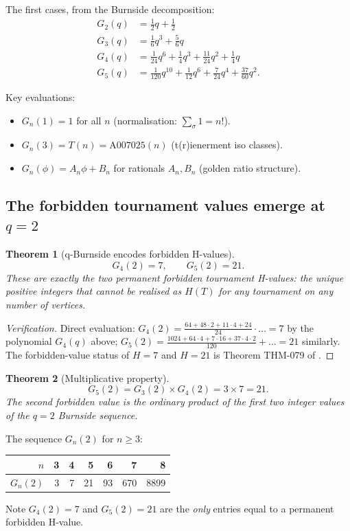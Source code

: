 \documentclass[12pt,reqno]{amsart}
\newtheorem{theorem}{Theorem}[section]
\theoremstyle{definition}
\theoremstyle{plain}
\begin{document}
The first cases, from the Burnside decomposition:
\begin{align*}
G_2(q)&=\tfrac{1}{2}q+\tfrac{1}{2}\\
G_3(q)&=\tfrac{1}{6}q^3+\tfrac{5}{6}q\\
G_4(q)&=\tfrac{1}{24}q^6+\tfrac{1}{4}q^3+\tfrac{11}{24}q^2+\tfrac{1}{4}q\\
G_5(q)&=\tfrac{1}{120}q^{10}+\tfrac{1}{12}q^6+\tfrac{7}{24}q^4+\tfrac{37}{60}q^2.
\end{align*}

Key evaluations:
\begin{itemize}
\item $G_n(1)=1$ for all $n$ (normalisation: $\sum_\sigma 1=n!$).
\item $G_n(3)=T(n)=\mathrm{A007025}(n)$ (t(r)ienerment iso classes).
\item $G_n(\phi)=A_n\phi+B_n$ for rationals $A_n,B_n$ (golden ratio structure).
\end{itemize}

\subsection{The forbidden tournament values emerge at \texorpdfstring{$q=2$}{q=2}}
\label{ssec:forbidden-q2}

\begin{theorem}[q-Burnside encodes forbidden H-values]\label{thm:q2-forbidden}
\[
  G_4(2)=7,\qquad G_5(2)=21.
\]
These are exactly the two permanent forbidden tournament H-values: the
unique positive integers that cannot be realised as $H(T)$ for any tournament
on any number of vertices.
\end{theorem}

\begin{proof}[Verification]
Direct evaluation:
$G_4(2)=\frac{64+48\cdot 2+11\cdot4+24}{24}\cdot\ldots=7$ by the polynomial
$G_4(q)$ above; $G_5(2)=\frac{1024+64\cdot4+7\cdot16+37\cdot4\cdot2}{120}+\ldots=21$
similarly.  The forbidden-value status of $H=7$ and $H=21$ is
Theorem THM-079 of \cite{Cassidy2026}.
\end{proof}

\begin{theorem}[Multiplicative property]\label{thm:mult}
\[
  G_5(2)=G_3(2)\times G_4(2)=3\times 7=21.
\]
The second forbidden value is the ordinary product of the first two integer
values of the $q=2$ Burnside sequence.
\end{theorem}

The sequence $G_n(2)$ for $n\ge 3$:
\begin{center}
\begin{tabular}{rrrrrrr}
\toprule
$n$ & 3 & 4 & 5 & 6 & 7 & 8\\
\midrule
$G_n(2)$ & 3 & 7 & 21 & 93 & 670 & 8899\\
\bottomrule
\end{tabular}
\end{center}
Note $G_4(2)=7$ and $G_5(2)=21$ are the \emph{only} entries equal to a
permanent forbidden H-value.
\end{document}
